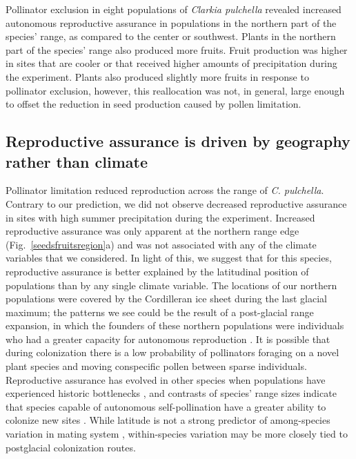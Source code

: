 \documentclass{article}
\begin{document}
Pollinator exclusion in eight populations of \textit{Clarkia pulchella} revealed increased autonomous reproductive assurance in populations in the northern part of the species' range, as compared to the center or southwest. Plants in the northern part of the species' range also produced more fruits. Fruit production was higher in sites that are cooler or that received higher amounts of precipitation during the experiment. Plants also produced slightly more fruits in response to pollinator exclusion, however, this reallocation was not, in general, large enough to offset the reduction in seed production caused by pollen limitation.

\subsection*{Reproductive assurance is driven by geography rather than climate}

Pollinator limitation reduced reproduction across the range of \textit{C. pulchella}. Contrary to our prediction, we did not observe decreased reproductive assurance in sites with high summer precipitation during the experiment. Increased reproductive assurance was only apparent at the northern range edge (Fig.\ \ref{seedsfruitsregion}a) and was not associated with any of the climate variables that we considered. In light of this, we suggest that for this species, reproductive assurance is better explained by the latitudinal position of populations than by any single climate variable. The locations of our northern populations were covered by the Cordilleran ice sheet during the last glacial maximum; the patterns we see could be the result of a post-glacial range expansion, in which the founders of these northern populations were individuals who had a greater capacity for autonomous reproduction \citep{baker1955self}. It is possible that during colonization there is a low probability of pollinators foraging on a novel plant species and moving conspecific pollen between sparse individuals. Reproductive assurance has evolved in other species when populations have experienced historic bottlenecks \citep{busch2005evolution}, and contrasts of species' range sizes indicate that species capable of autonomous self-pollination have a greater ability to colonize new sites \citep{randle2009can}. While latitude is not a strong predictor of among-species variation in mating system \citep{moeller2017}, within-species variation may be more closely tied to postglacial colonization routes.
\end{document}
